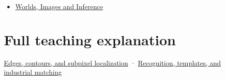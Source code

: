 \begin{itemize}
\tightlist
\item
  \href{Continuous\%20Notes/University\%20-\%20Worlds,\%20Images\%20and\%20Inference\%20-\%20Graphics,\%20Vision\%20and\%20Photography}{Worlds, Images and Inference}
\end{itemize}

\section{Full teaching explanation}\label{appendix-a5b0383b3b3e-full-teaching-explanation}

\href{Continuous\%20Notes/University\%20-\%20Worlds,\%20Images\%20and\%20Inference\%20-\%20Graphics,\%20Vision\%20and\%20Photography\#Edges,\%20contours,\%20and\%20subpixel\%20localization}{Edges, contours, and subpixel localization} · \href{Continuous\%20Notes/University\%20-\%20Worlds,\%20Images\%20and\%20Inference\%20-\%20Graphics,\%20Vision\%20and\%20Photography\#Recognition,\%20templates,\%20and\%20industrial\%20matching}{Recognition, templates, and industrial matching}
